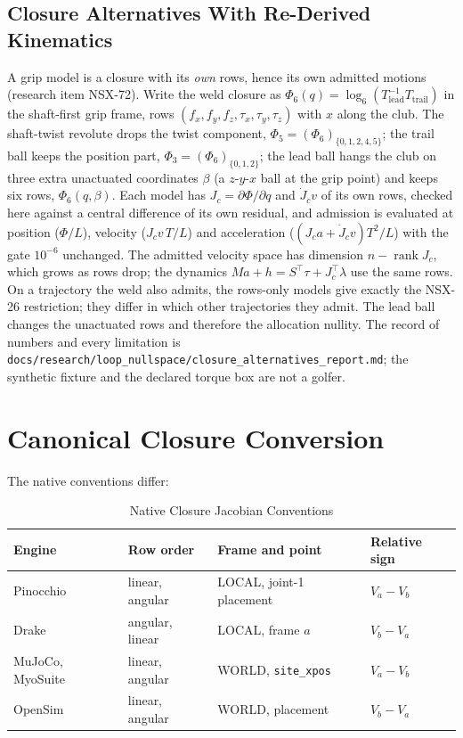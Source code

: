 \documentclass[11pt,a4paper]{article}
\begin{document}
\subsection{Closure Alternatives With Re-Derived Kinematics}
\label{sec:alternatives}
A grip model is a closure with its \emph{own} rows, hence its own admitted
motions (research item NSX-72).  Write the weld closure as
$\Phi_6(q)=\log_6(T_{\mathrm{lead}}^{-1}T_{\mathrm{trail}})$ in the shaft-first
grip frame, rows $(f_x,f_y,f_z,\tau_x,\tau_y,\tau_z)$ with $x$ along the club.
The shaft-twist revolute drops the twist component, $\Phi_5=(\Phi_6)_{\{0,1,2,4,5\}}$;
the trail ball keeps the position part, $\Phi_3=(\Phi_6)_{\{0,1,2\}}$; the lead
ball hangs the club on three extra unactuated coordinates $\beta$ (a $z$-$y$-$x$
ball at the grip point) and keeps six rows, $\Phi_6(q,\beta)$.  Each model has
$J_c=\partial\Phi/\partial q$ and $\dot J_c v$ of its own rows, checked here
against a central difference of its own residual, and admission is evaluated
at position ($\Phi/L$), velocity ($J_c v\,T/L$) and acceleration
($(J_c a+\dot J_c v)T^2/L$) with the gate $10^{-6}$ unchanged.  The admitted
velocity space has dimension $n-\operatorname{rank}J_c$, which grows as rows
drop; the dynamics $Ma+h=S^\top\tau+J_c^\top\lambda$ use the same rows.  On a
trajectory the weld also admits, the rows-only models give exactly the NSX-26
restriction; they differ in which other trajectories they admit.  The lead ball
changes the unactuated rows and therefore the allocation nullity.  The record
of numbers and every limitation is
\texttt{docs/research/loop\_nullspace/closure\_alternatives\_report.md}; the
synthetic fixture and the declared torque box are not a golfer.

\section{Canonical Closure Conversion}
\label{sec:conversion}

The native conventions differ:

\begin{table}[ht]
\centering
\caption{Native Closure Jacobian Conventions}
\label{tab:native}
\small
\begin{tabular}{@{}llll@{}}
\toprule
Engine & Row order & Frame and point & Relative sign \\
\midrule
Pinocchio & linear, angular & LOCAL, joint-1 placement & $V_a-V_b$ \\
Drake & angular, linear & LOCAL, frame $a$ & $V_b-V_a$ \\
MuJoCo, MyoSuite & linear, angular & WORLD, \texttt{site\_xpos} & $V_a-V_b$ \\
OpenSim & linear, angular & WORLD, placement & $V_b-V_a$ \\
\bottomrule
\end{tabular}
\end{table}
\end{document}
